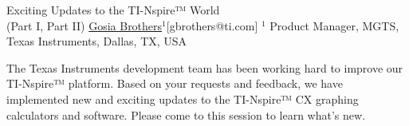 


\begin{abstract_online}{Exciting Updates to the TI-Nspire™ World\\ (Part I, Part II)}{%
        \underline{Gosia Brothers}$^{1}$}{[gbrothers@ti.com]
        }{%
        $^1$ Product Manager, MGTS, Texas Instruments, Dallas, TX, USA \newline{}}
    
The Texas Instruments development team has been working hard to improve our TI-Nspire™ platform. Based on your requests and feedback, we have implemented new and exciting updates to the TI-Nspire™ CX graphing calculators and software. Please come to this session to learn what’s new.


\end{abstract_online}
    